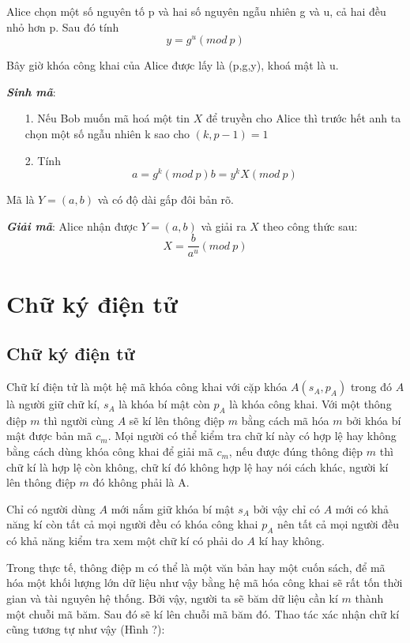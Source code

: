 \documentclass[a4paper,12pt]{report}
\begin{document}
Alice chọn một số nguyên tố p và hai số nguyên ngẫu nhiên g và u, cả hai đều nhỏ hơn p. Sau đó tính 
\begin{displaymath}
y = g^u (mod \ p)
\end{displaymath}

Bây giờ khóa công khai của Alice được lấy là (p,g,y), khoá mật là u.

\textbf{\textit{Sinh mã}}:
\begin{itemize}
\item[1. ] Nếu Bob muốn mã hoá một tin $X$ để truyền cho Alice thì trước hết anh ta chọn một số ngẫu nhiên k sao cho $(k,p-1) = 1$
\item[2. ] Tính 
\begin{displaymath}
a = g^k(mod \ p)
b = y^kX(mod \ p)
\end{displaymath}
\end{itemize}

Mã là $Y = (a,b)$ và có độ dài gấp đôi bản rõ.

\textbf{\textit{Giải mã}}: Alice nhận được $Y = (a,b)$ và giải ra $X$ theo công thức sau:
\begin{displaymath}
X = \frac{b}{a^u} (mod \ p)
\end{displaymath}
\section{Chữ ký điện tử}
\subsection*{Chữ ký điện tử}
Chữ kí điện tử là một hệ mã khóa công khai với cặp khóa $A(s_A, p_A)$ trong đó $A$ là người giữ chữ kí, $s_A$ là khóa bí mật còn $p_A$ là khóa công khai. Với một thông điệp $m$ thì người cùng $A$ sẽ kí lên thông điệp $m$ bằng cách mã hóa $m$ bởi khóa bí mật được bản mã $c_m$. Mọi người có thể kiểm tra chữ kí này có hợp lệ hay không bằng cách dùng khóa công khai để giải mã $c_m$, nếu được đúng thông điệp $m$ thì chữ kí là hợp lệ còn không, chữ kí đó không hợp lệ hay nói cách khác, người kí lên thông điệp $m$ đó không phải là A.

Chỉ có người dùng $A$ mới nắm giữ khóa bí mật $s_A$ bởi vậy chỉ có $A$ mới có khả năng kí còn tất cả mọi người đều có khóa công khai $p_A$ nên tất cả mọi người đều có khả năng kiểm tra xem một chữ kí có phải do $A$ kí hay không.

Trong thực tế, thông điệp m có thể là một văn bản hay một cuốn sách, để mã hóa một khối lượng lớn dữ liệu như vậy bằng hệ mã hóa công khai sẽ rất tốn thời gian và tài nguyên hệ thống. Bởi vậy, người ta sẽ băm dữ liệu cần kí $m$ thành một chuỗi mã băm. Sau đó sẽ kí lên chuỗi mã băm đó. Thao tác xác nhận chữ kí cũng tương tự như vậy (Hình ?):
\end{document}
